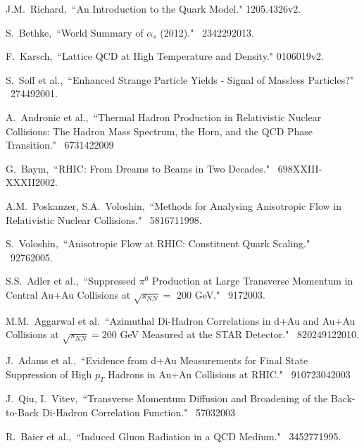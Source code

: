 \begin{thebibliography}{1000}


J.M.~Richard,~``An Introduction to the Quark Model." \arXiv1205.4326v2.

S.~Bethke,~``World Summary of $\alpha_{s}$ (2012)." \Journal{\NPB} {~234}{229}{2013}.

F.~Karsch,~``Lattice QCD at High Temperature and Density." \arXiv0106019v2.

S.~Soff et al.,~``Enhanced Strange Particle Yields - Signal of Massless Particles?" \Journal{\JPG} {~27}{449}{2001}.

A.~Andronic et al.,~``Thermal Hadron Production in Relativistic Nuclear Collisions: The Hadron Mass Spectrum, the Horn, and the QCD Phase Transition." \Journal{\PLB} {~673}{142}{2009}

G.~Baym,~``RHIC: From Dreams to Beams in Two Decades." \Journal{\NPA} {~698}{XXIII-XXXII}{2002}.

A.M.~Poskanzer, S.A.~Voloshin,~``Methods for Analysing Anisotropic Flow in Relativistic Nuclear Collisions." \Journal{\PRC} {~58}{1671}{1998}.

S.~Voloshin,~``Anisotropic Flow at RHIC: Constituent Quark Scaling." \textit {}~{} {~9}{276}{2005}.

S.S.~Adler et al.,~``Suppressed $\pi^0$ Production at Large Transverse Momentum in Central Au+Au Collisions at $\sqrt{s_{NN}} = $ 200 GeV." \Journal{\PRL} {~91}{7}{2003}.

M.M.~Aggarwal et al.~``Azimuthal Di-Hadron Correlations in d+Au and Au+Au Collisions at $\sqrt{s_{NN}} = 200$ GeV Measured at the STAR Detector." \Journal{\PRC} {~82}{024912}{2010}.

J.~Adams et al.,~``Evidence from d+Au Measurements for Final State Suppression of High $p_T$ Hadrons in Au+Au Collisions at RHIC." \Journal{\PRL} {~91}{072304}{2003}

J.~Qiu, I.~Vitev,~``Transverse Momentum Diffusion and Broadening of the Back-to-Back Di-Hadron Correlation Function." \Journal{\PLB} {~570}{3}{2003}

R.~Baier et al.,~``Induced Gluon Radiation in a QCD Medium." \Journal{\PLB} {~345}{277}{1995}.


\end{thebibliography}
